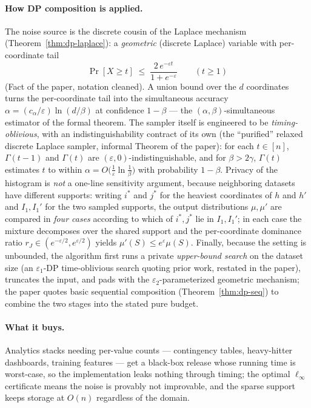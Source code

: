 \paragraph{How DP composition is applied.}
The noise source is the discrete cousin of the Laplace mechanism
(Theorem~\ref{thm:dp-laplace}): a \emph{geometric} (discrete Laplace) variable with
per-coordinate tail
\[
\Pr[X \ge t] \;\le\; \frac{2\,e^{-\varepsilon t}}{1 + e^{-\varepsilon}}
\qquad (t \ge 1)
\]
(Fact of the paper, notation cleaned). A union bound over the $d$ coordinates turns the
per-coordinate tail into the simultaneous accuracy
$\alpha = (c_\alpha/\varepsilon)\ln(d/\beta)$ at confidence $1-\beta$ --- the
$(\alpha,\beta)$-simultaneous estimator of the formal theorem. The sampler itself is
engineered to be \emph{timing-oblivious}, with an indistinguishability contract of its
own (the ``purified'' relaxed discrete Laplace sampler, informal Theorem of the paper):
for each $t \in [n]$, $\Gamma(t-1)$ and $\Gamma(t)$ are
$(\varepsilon,0)$-indistinguishable, and for $\beta > 2\gamma$, $\Gamma(t)$ estimates
$t$ to within $\alpha = O\bigl(\tfrac1\varepsilon \ln\tfrac1\beta\bigr)$ with
probability $1-\beta$. Privacy of the histogram is \emph{not} a one-line sensitivity
argument, because neighboring datasets have different supports: writing $i^*$ and $j^*$
for the heaviest coordinates of $h$ and $h'$ and $I_1, I_1'$ for the two sampled
supports, the output distributions $\mu, \mu'$ are compared in \emph{four cases}
according to which of $i^*, j^*$ lie in $I_1, I_1'$; in each case the mixture
decomposes over the shared support and the per-coordinate dominance ratio
$r_J \in (e^{-\varepsilon/2}, e^{\varepsilon/2})$ yields
$\mu'(S) \le e^{\varepsilon}\mu(S)$. Finally, because the setting is unbounded, the
algorithm first runs a private \emph{upper-bound search} on the dataset size (an
$\varepsilon_1$-DP time-oblivious search quoting prior work, restated in the paper),
truncates the input, and pads with the $\varepsilon_2$-parameterized geometric
mechanism; the paper quotes basic sequential composition
(Theorem~\ref{thm:dp-seq}) to combine the two stages into the stated pure budget.

\paragraph{What it buys.}
Analytics stacks needing per-value counts --- contingency tables, heavy-hitter
dashboards, training features --- get a black-box release whose running time is
worst-case, so the implementation leaks nothing through timing; the optimal
$\ell_\infty$ certificate means the noise is provably not improvable, and the sparse
support keeps storage at $O(n)$ regardless of the domain.

